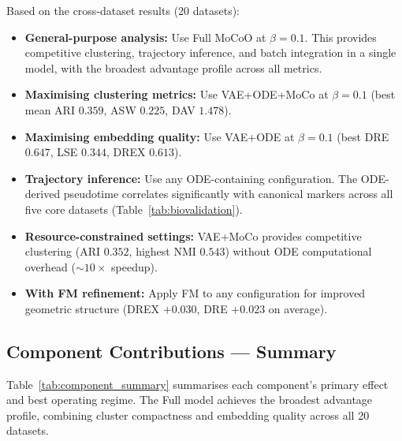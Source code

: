 \documentclass[biology,article,submit,pdftex]{Definitions/mdpi}
\begin{document}
Based on the cross-dataset results (20 datasets):
\begin{itemize}
    \item \textbf{General-purpose analysis:} Use Full MoCoO at $\beta{=}0.1$. This provides competitive clustering, trajectory inference, and batch integration in a single model, with the broadest advantage profile across all metrics.
    \item \textbf{Maximising clustering metrics:} Use VAE+ODE+MoCo at $\beta{=}0.1$ (best mean ARI $0.359$, ASW $0.225$, DAV $1.478$).
    \item \textbf{Maximising embedding quality:} Use VAE+ODE at $\beta{=}0.1$ (best DRE $0.647$, LSE $0.344$, DREX $0.613$).
    \item \textbf{Trajectory inference:} Use any ODE-containing configuration. The ODE-derived pseudotime correlates significantly with canonical markers across all five core datasets (Table~\ref{tab:biovalidation}).
    \item \textbf{Resource-constrained settings:} VAE+MoCo provides competitive clustering (ARI $0.352$, highest NMI $0.543$) without ODE computational overhead (${\sim}10\times$ speedup).
    \item \textbf{With FM refinement:} Apply FM to any configuration for improved geometric structure (DREX $+0.030$, DRE $+0.023$ on average).
\end{itemize}

\subsection{Component Contributions --- Summary}
\label{sec:discussion:summary}

Table~\ref{tab:component_summary} summarises each component's primary effect and best operating regime. The Full model achieves the broadest advantage profile, combining cluster compactness and embedding quality across all 20 datasets.

\begin{table}[!t]
    \centering
    \caption{Component contributions summary.}
    \label{tab:component_summary}
\end{table}
\end{document}
